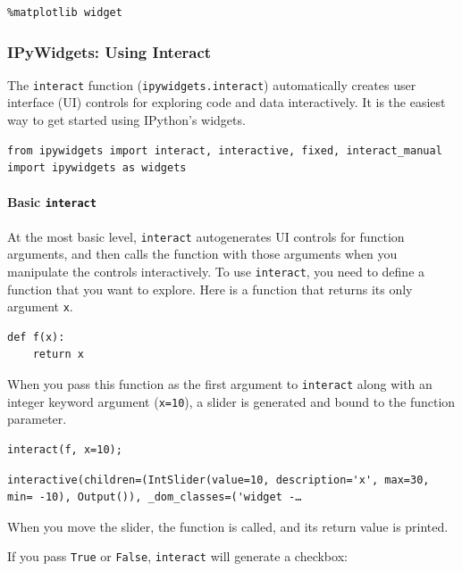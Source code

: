 \begin{verbatim}
%matplotlib widget
\end{verbatim}

\subsubsection{IPyWidgets: Using Interact}

The \texttt{interact} function (\texttt{ipywidgets.interact}) automatically creates user interface (UI) controls for exploring code and data interactively. It is the easiest way to get started using IPython's widgets.

\begin{verbatim}
from ipywidgets import interact, interactive, fixed, interact_manual
import ipywidgets as widgets
\end{verbatim}

\paragraph{Basic \texttt{interact}}

At the most basic level, \texttt{interact} autogenerates UI controls for function arguments, and then calls the function with those arguments when you manipulate the controls interactively. To use \texttt{interact}, you need to define a function that you want to explore. Here is a function that returns its only argument \texttt{x}.

\begin{verbatim}
def f(x):
    return x
\end{verbatim}

When you pass this function as the first argument to \texttt{interact} along with an integer keyword argument (\texttt{x=10}), a slider is generated and bound to the function parameter.

\begin{verbatim}
interact(f, x=10);
\end{verbatim}

\begin{verbatim}
interactive(children=(IntSlider(value=10, description='x', max=30, min= -10), Output()), _dom_classes=('widget -…
\end{verbatim}

When you move the slider, the function is called, and its return value is printed.

If you pass \texttt{True} or \texttt{False}, \texttt{interact} will generate a checkbox:

